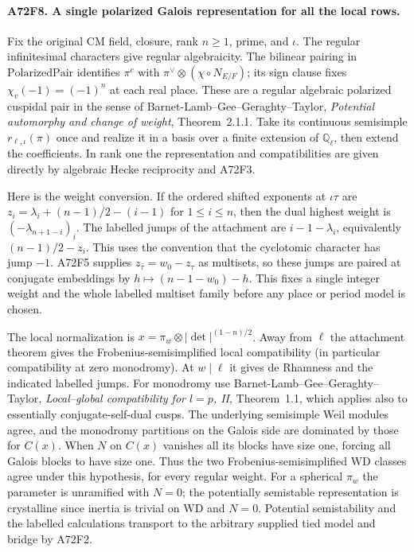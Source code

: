 \paragraph{A72F8. A single polarized Galois representation for all the local rows.}
Fix the original CM field, closure, rank $n\ge1$, prime, and
$\iota$. The regular infinitesimal characters give regular
algebraicity. The bilinear pairing in $\mathrm{PolarizedPair}$
identifies $\pi^c$ with $\pi^\vee\otimes(\chi\circ N_{E/F})$;
its sign clause fixes $\chi_v(-1)=(-1)^n$ at each real place.
These are a regular algebraic polarized cuspidal pair in the sense
of Barnet-Lamb--Gee--Geraghty--Taylor, \emph{Potential automorphy
and change of weight}, Theorem~2.1.1. Take its continuous
semisimple $r_{\ell,\iota}(\pi)$ once and realize it in a basis
over a finite extension of $\mathbb Q_\ell$, then extend the
coefficients. In rank one the representation and compatibilities
are given directly by algebraic Hecke reciprocity and A72F3.

Here is the weight conversion. If the ordered shifted exponents
at $\iota\tau$ are
$z_i=\lambda_i+(n-1)/2-(i-1)$ for $1\le i\le n$, then
the dual highest weight is $(-\lambda_{n+1-i})_i$. The labelled
jumps of the attachment are $i-1-\lambda_i$, equivalently
$(n-1)/2-z_i$. This uses the convention that the cyclotomic
character has jump $-1$. A72F5 supplies
$z_{\bar\tau}=w_0-z_\tau$ as multisets, so these jumps are
paired at conjugate embeddings by $h\mapsto (n-1-w_0)-h$.
This fixes a single integer weight and the whole labelled
multiset family before any place or period model is chosen.

The local normalization is $x=\pi_w\otimes|\det|^{(1-n)/2}$.
Away from $\ell$ the attachment theorem gives the
Frobenius-semisimplified local compatibility (in particular
compatibility at zero monodromy). At $w\mid\ell$ it gives de
Rhamness and the indicated labelled jumps. For monodromy use
Barnet-Lamb--Gee--Geraghty--Taylor, \emph{Local--global compatibility
for $l=p$, II}, Theorem~1.1, which applies also to essentially
conjugate-self-dual cusps. The underlying semisimple Weil modules
agree, and the monodromy partitions on the Galois side are
dominated by those for $C(x)$. When $N$ on $C(x)$ vanishes all
its blocks have size one, forcing all Galois blocks to have size
one. Thus the two Frobenius-semisimplified WD classes agree
under this hypothesis, for every regular weight. For a spherical
$\pi_w$ the parameter is unramified with $N=0$; the potentially
semistable representation is crystalline since inertia is trivial
on WD and $N=0$. Potential semistability and the labelled
calculations transport to the arbitrary supplied tied model
and bridge by A72F2.

